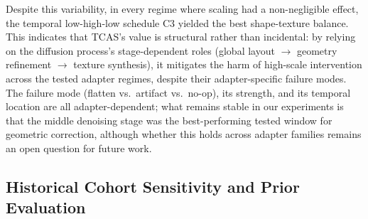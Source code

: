 \documentclass[times,twocolumn,final]{elsarticle}
\providecommand{\DIFdel}[1]{{\protect\color{red} \scriptsize #1}} %
\providecommand{\DIFaddbegin}{} %
\providecommand{\DIFaddend}{} %
\providecommand{\DIFdelbegin}{} %
\providecommand{\DIFdelend}{} %
\begin{document}
\DIFdelbegin \DIFdel{Despite this variability, in every regime where scaling had a non-negligible effect, the temporal low-high-low schedule C3 yielded the best shape-texture balance. This indicates that TCAS's value is structural rather than incidental: by relying on the diffusion process's stage-dependent roles (global layout $\to$ geometry refinement $\to$ texture synthesis), it mitigates the harm of high-scale intervention across the tested adapter regimes, despite their adapter-specific failure modes. The failure mode (flatten vs.\ artifact vs.\ no-op), its strength, and its temporal location are all adapter-dependent; what remains stable in our experiments is that the middle denoising stage was the best-performing tested window for geometric correction, although whether this holds across adapter families remains an open question for future work. }\DIFdelend \DIFaddbegin \subsection{Historical Cohort Sensitivity and Prior Evaluation}
\label{subsec:original276}
\DIFaddend
\end{document}
